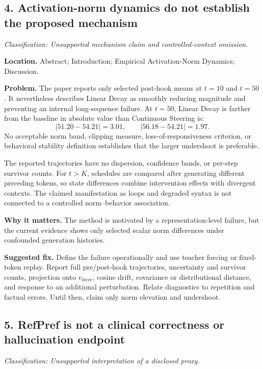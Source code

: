 \documentclass[11pt]{article}
\newcommand{\findinglabel}[1]{\textbf{#1}}
\newcommand{\classification}[1]{\textit{Classification: #1.}}
\begin{document}
\subsection*{4. Activation-norm dynamics do not establish the proposed mechanism}

\classification{Unsupported mechanism claim and controlled-context omission}

\findinglabel{Location.} Abstract; Introduction; Empirical Activation-Norm Dynamics; Discussion.

\findinglabel{Problem.} The paper reports only selected post-hook means at $t=10$ and $t=50$.  It nevertheless describes Linear Decay as smoothly reducing magnitude and preventing an internal long-sequence failure.  At $t=50$, Linear Decay is farther from the baseline in absolute value than Continuous Steering is:
\[
|51.20-54.21|=3.01,
\qquad
|56.18-54.21|=1.97.
\]
No acceptable norm band, clipping measure, loss-of-responsiveness criterion, or behavioral stability definition establishes that the larger undershoot is preferable.

The reported trajectories have no dispersion, confidence bands, or per-step survivor counts.  For $t>K$, schedules are compared after generating different preceding tokens, so state differences combine intervention effects with divergent contexts.  The claimed manifestation as loops and degraded syntax is not connected to a controlled norm--behavior association.

\findinglabel{Why it matters.} The method is motivated by a representation-level failure, but the current evidence shows only selected scalar norm differences under confounded generation histories.

\findinglabel{Suggested fix.} Define the failure operationally and use teacher forcing or fixed-token replay.  Report full pre/post-hook trajectories, uncertainty and survivor counts, projection onto $v_{\text{steer}}$, cosine drift, covariance or distributional distance, and response to an additional perturbation.  Relate diagnostics to repetition and factual errors.  Until then, claim only norm elevation and undershoot.

\subsection*{5. RefPref is not a clinical correctness or hallucination endpoint}

\classification{Unsupported interpretation of a disclosed proxy}
\end{document}
